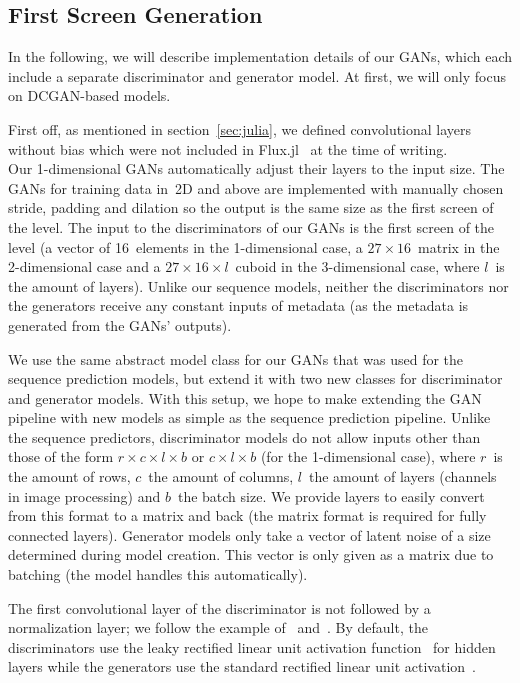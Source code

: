 \subsection{First Screen Generation}
\label{sec:first-screen-generation}

In the following, we will describe implementation details of our GANs,
which each include a separate discriminator and generator model.
At first, we will only focus on DCGAN-based models.

First off, as mentioned in section~\ref{sec:julia}, we defined
convolutional layers without bias which were not included in
\mbox{Flux.jl}~\cite{FluxMLFluxJl2019} at the time of writing. \\
Our 1-dimensional GANs automatically adjust their layers to the input
size. The GANs for training data in~2D and above are implemented with
manually chosen stride, padding and dilation so the output is the same
size as the first screen of the level. The input to the discriminators
of our GANs is the first screen of the level (a vector of 16~elements
in the 1-dimensional case, a $27 \times 16$~matrix in the 2-dimensional
case and a $27 \times 16 \times l$~cuboid in the 3-dimensional case, where
$l$~is the amount of layers). Unlike our sequence models, neither the
discriminators nor the generators receive any constant inputs of
metadata (as the metadata is generated from the GANs' outputs).

We use the same abstract model class for our GANs that was used for
the sequence prediction models, but extend it with two new classes for
discriminator and generator models. With this setup, we hope to make
extending the GAN pipeline with new models as simple as the sequence
prediction pipeline. Unlike the sequence predictors, discriminator
models do not allow inputs other than those of the form
$r \times c \times l \times b$ or $c \times l \times b$ (for the
1-dimensional case), where $r$~is the amount of rows, $c$~the amount
of columns, $l$~the amount of layers (channels in image processing)
and $b$~the batch size. We provide layers to easily convert from this
format to a matrix and back (the matrix format is required for fully
connected layers). Generator models only take a vector of latent noise
of a size determined during model creation. This vector is only given
as a matrix due to batching (the model handles this automatically).

The first convolutional layer of the discriminator is not followed by
a normalization layer; we follow the example
of~\cite{PytorchExamples2019}
and~\cite{martinarjovskyMartinarjovskyWassersteinGAN2019}. By default,
the discriminators use the leaky rectified linear unit activation
function~\cite{maasRectifierNonlinearitiesImprove,RectifierNeuralNetworks2019}
for hidden layers while the generators use the standard rectified
linear unit
activation~\cite{nairRectifiedLinearUnits,RectifierNeuralNetworks2019}.

